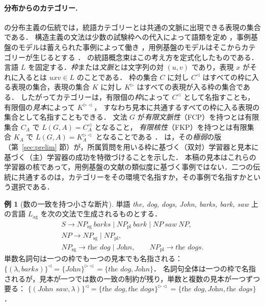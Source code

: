 \documentclass[11pt,a4paper]{ltjsarticle}
\numberwithin{equation}{section}
\theoremstyle{plain}
\theoremstyle{definition}
\newtheorem{example}[theorem]{例}
\theoremstyle{remark}
\theoremstyle{plain}
\newcommand{\eps}{\lambda}
\newcommand{\R}{^{\rhd}}
\newcommand{\Lc}{^{\lhd}}
\newcommand{\RL}{^{\rhd\lhd}}
\begin{document}
\paragraph{分布からのカテゴリー.}
\citet{harris1954} の分布主義の伝統では，統語カテゴリーとは共通の文脈に出現できる表現の集合である．
構造主義の文法は少数の試験枠への代入によって語類を定め \citep[pp.~74--75]{fries1952}，事例基盤のモデルは蓄えられた事例によって働き \citep{bod2006}，用例基盤のモデルはそこからカテゴリーが生じるとする \citep{bybee2006}．
\citet{clark2009fg,clark2010icgi,clark2013} の統語概念束はこの考え方を定式化したものである．
言語 $L$ を固定する．\emph{枠}または\emph{文脈}とは文字列の対 $(u,v)$ であり，表現 $x$ がそれに入るとは $uxv\in L$ のことである．
枠の集合 $C$ に対し $C\Lc$ はすべての枠に入る表現の集合，表現の集合 $K$ に対し $K\R$ はすべての表現が入る枠の集合である．
したがってカテゴリーは，有限個の\emph{枠}によって $C\Lc$ として名指すことも，有限個の\emph{見本}によって $K\RL$，
すなわち見本に共通するすべての枠に入る表現の集合として名指すこともできる．
文法 $G$ が\emph{有限文脈性}（FCP）を持つとは有限集合 $C_A$ で $L(G,A)=C_A\Lc$ となること，
\emph{有限核性}（FKP）を持つとは有限集合 $K_A$ で $L(G,A)=K_A\RL$ となることである
\citep{clark2010icgi,yoshinaka2011dlt,clark-yoshinaka2016}．
\citet{ky2017} は，その\emph{極弱}の版（第~\ref{sec:prelim} 節）が，所属質問を用いる枠に基づく（双対）学習器と見本に基づく（主）学習器の成功を特徴づけることを示した．
本稿の見本はこれらの学習器の核であって，用例基盤の文献の類似度に基づく事例ではない．二つの伝統に共通するのは，カテゴリーをその環境で名指すか，その事例で名指すかという選択である．

\begin{example}[数の一致を持つ小さな断片]\label{ex:toy}
単語 \emph{the, dog, dogs, John, barks, bark, saw} 上の言語 $L_{\mathrm{ag}}$ を次の文法で生成されるものとする．
\begin{gather*}
S\to NP_{\mathrm{sg}}\ \textit{barks}\mid
NP_{\mathrm{pl}}\ \textit{bark}\mid NP\ \textit{saw}\ NP,\\
NP\to NP_{\mathrm{sg}}\mid NP_{\mathrm{pl}},\\
NP_{\mathrm{sg}}\to\textit{the dog}\mid\textit{John},\qquad
NP_{\mathrm{pl}}\to\textit{the dogs}.
\end{gather*}
単数名詞句は一つの枠でも一つの見本でも名指される：
$\{(\eps,\textit{barks})\}\Lc=\{\textit{John}\}\RL=\{\textit{the dog},\textit{John}\}$．
名詞句全体は一つの枠で名指されるが，見本が一つでは数の一致の制約が残り，単数と複数の見本が一つずつ要る：
$\{(\textit{John saw},\eps)\}\Lc=\{\textit{the dog},\textit{the dogs}\}\RL=\{\textit{the dog},\textit{John},\textit{the dogs}\}$．
\end{example}
\end{document}
